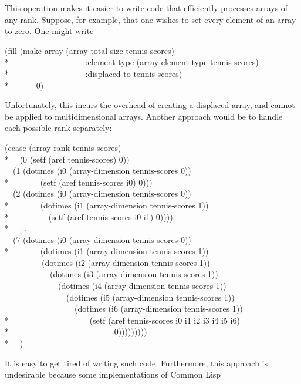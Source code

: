 \begin{new}
\begin{defun}[Function]
This operation makes it easier to write code that efficiently processes
arrays of any rank.  Suppose, for example, that one wishes to set every
element of an array  to zero.  One might write
\begin{lisp}
(fill (make-array (array-total-size tennis-scores) \\*
~~~~~~~~~~~~~~~~~~:element-type (array-element-type tennis-scores) \\*
~~~~~~~~~~~~~~~~~~:displaced-to tennis-scores) \\*
~~~~~~0)
\end{lisp}
Unfortunately, this incurs the overhead of creating a displaced array,
and  cannot be applied to multidimensional arrays.
Another approach would be to handle each possible rank separately:
\begin{lisp}
(ecase (array-rank tennis-scores) \\*
~~(0 (setf (aref tennis-scores) 0)) \\
~~(1 (dotimes (i0 (array-dimension tennis-scores 0)) \\*
~~~~~~~(setf (aref tennis-scores i0) 0))) \\
~~(2 (dotimes (i0 (array-dimension tennis-scores 0)) \\*
~~~~~~~(dotimes (i1 (array-dimension tennis-scores 1)) \\*
~~~~~~~~~(setf (aref tennis-scores i0 i1) 0)))) \\*
~~... \\
~~(7 (dotimes (i0 (array-dimension tennis-scores 0)) \\*
~~~~~~~(dotimes (i1 (array-dimension tennis-scores 1)) \\
~~~~~~~~~(dotimes (i2 (array-dimension tennis-scores 1)) \\
~~~~~~~~~~~(dotimes (i3 (array-dimension tennis-scores 1)) \\
~~~~~~~~~~~~~(dotimes (i4 (array-dimension tennis-scores 1)) \\
~~~~~~~~~~~~~~~(dotimes (i5 (array-dimension tennis-scores 1)) \\
~~~~~~~~~~~~~~~~~(dotimes (i6 (array-dimension tennis-scores 1)) \\*
~~~~~~~~~~~~~~~~~~~(setf (aref tennis-scores i0 i1 i2 i3 i4 i5 i6) \\*
~~~~~~~~~~~~~~~~~~~~~~~~~0))))))))) \\*
~~)
\end{lisp}
It is easy to get tired of writing such code.  Furthermore, this approach
is undesirable because some implementations of Common Lisp

\end{defun}
\end{new}
